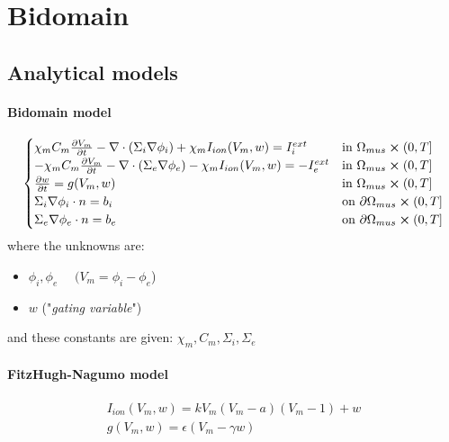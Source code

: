\documentclass[a4paper]{article}
\begin{document}
\newpage

\section{Bidomain}
\vspace{5mm}
\subsection{Analytical models}
\vspace{5mm}
\paragraph{Bidomain model}
\begin{equation}\label{ref6}
\begin{cases}
\chi_m C_m\pdv{V_m}{t} - \nabla \cdot (\Sigma_i \nabla \phi_i) + \chi_m I_{ion}(V_m,w) = I_i^{ext}    & \text{in } \Omega_{mus} \cross (0,T]
\\
-\chi_m C_m\pdv{V_m}{t} - \nabla \cdot (\Sigma_e \nabla \phi_e) - \chi_m I_{ion}(V_m,w) = -I_e^{ext}    & \text{in } \Omega_{mus} \cross (0,T]
\\
\pdv{w}{t} = g(V_m, w)  & \text{in } \Omega_{mus} \cross (0,T]
\\
\Sigma_i\nabla \phi_i \cdot n = b_i   & \text{on } \partial \Omega_{mus} \cross (0,T]
\\
\Sigma_e\nabla \phi_e \cdot n = b_e   & \text{on } \partial \Omega_{mus} \cross (0,T]
\end{cases}
\end{equation}
\vspace{4mm}\newline
where the unknowns are:
\begin{itemize}
	\item $\phi_i, \phi_e$  $\quad (V_m = \phi_i-\phi_e$)
	\item $w$  ("\emph{gating variable}")
\end{itemize}
and these constants are given: $\chi_m, C_m, \Sigma_i, \Sigma_e$

\paragraph{FitzHugh-Nagumo model}
\begin{equation}
\begin{gathered}
I_{ion}(V_m, w) = kV_m(V_m-a)(V_m-1) +w
\\
g(V_m,w) = \epsilon(V_m -\gamma w)
\end{gathered}
\end{equation}
\end{document}
